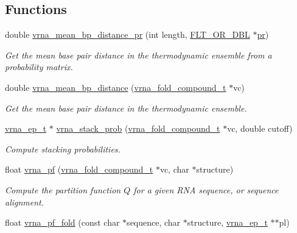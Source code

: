 \subsection*{Functions}
\begin{DoxyCompactItemize}
\item 
double \hyperlink{group__pf__fold_gad3f0c240512e6d43e2e4d4c2076021f5}{vrna\+\_\+mean\+\_\+bp\+\_\+distance\+\_\+pr} (int length, \hyperlink{group__data__structures_ga31125aeace516926bf7f251f759b6126}{F\+L\+T\+\_\+\+O\+R\+\_\+\+D\+BL} $\ast$\hyperlink{fold__vars_8h_ac98ec419070aee6831b44e5c700f090f}{pr})
\begin{DoxyCompactList}\small\item\em Get the mean base pair distance in the thermodynamic ensemble from a probability matrix. \end{DoxyCompactList}\item 
double \hyperlink{group__pf__fold_gaa6b8983b559b9ef4b2e1b31113ea317b}{vrna\+\_\+mean\+\_\+bp\+\_\+distance} (\hyperlink{group__fold__compound_ga1b0cef17fd40466cef5968eaeeff6166}{vrna\+\_\+fold\+\_\+compound\+\_\+t} $\ast$vc)
\begin{DoxyCompactList}\small\item\em Get the mean base pair distance in the thermodynamic ensemble. \end{DoxyCompactList}\item 
\hyperlink{group__struct__utils_gab9ac98ab55ded9fb90043b024b915aca}{vrna\+\_\+ep\+\_\+t} $\ast$ \hyperlink{group__pf__fold_ga132664bf29fdc30bb5ea715491d1ab22}{vrna\+\_\+stack\+\_\+prob} (\hyperlink{group__fold__compound_ga1b0cef17fd40466cef5968eaeeff6166}{vrna\+\_\+fold\+\_\+compound\+\_\+t} $\ast$vc, double cutoff)
\begin{DoxyCompactList}\small\item\em Compute stacking probabilities. \end{DoxyCompactList}\item 
float \hyperlink{group__pf__fold_ga29e256d688ad221b78d37f427e0e99bc}{vrna\+\_\+pf} (\hyperlink{group__fold__compound_ga1b0cef17fd40466cef5968eaeeff6166}{vrna\+\_\+fold\+\_\+compound\+\_\+t} $\ast$vc, char $\ast$structure)
\begin{DoxyCompactList}\small\item\em Compute the partition function $Q$ for a given R\+NA sequence, or sequence alignment. \end{DoxyCompactList}\item 
float \hyperlink{group__pf__fold_gac4a2a74a79e49818bc35412a2b392c7e}{vrna\+\_\+pf\+\_\+fold} (const char $\ast$sequence, char $\ast$structure, \hyperlink{group__struct__utils_gab9ac98ab55ded9fb90043b024b915aca}{vrna\+\_\+ep\+\_\+t} $\ast$$\ast$pl)
$$
\end{DoxyCompactItemize}
